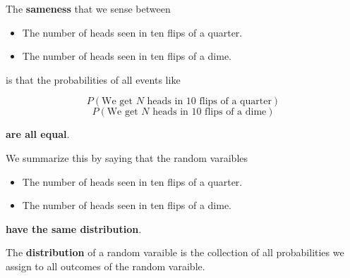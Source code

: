 %
\begin{frame}
The \textbf{sameness} that we sense between

\begin{itemize}
\item The number of heads seen in ten flips of a quarter.
\item The number of heads seen in ten flips of a dime.
\end{itemize}

is that the probabilities of all events like

$$ P(\text{We get } N \text{ heads in 10 flips of a quarter}) $$
$$ P(\text{We get } N \text{ heads in 10 flips of a dime}) $$

\textbf{are all equal}.
\end{frame}
%

%
\begin{frame}
We summarize this by saying that the random varaibles


\begin{itemize}
\item The number of heads seen in ten flips of a quarter.
\item The number of heads seen in ten flips of a dime.
\end{itemize}

\textbf{have the same distribution}.

The \textbf{distribution} of a random varaible is the collection of all
probabilities we assign to all outcomes of the random varaible.
\end{frame}
